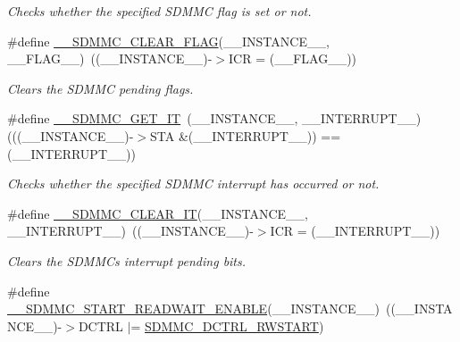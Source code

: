 \begin{DoxyCompactItemize}
\begin{DoxyCompactList}\small\item\em Checks whether the specified S\+D\+M\+MC flag is set or not. \end{DoxyCompactList}\item 
\#define \mbox{\hyperlink{group___s_d_m_m_c___l_l___interrupt___clock_ga1f35f651980bee563bd9c7d00052cdc8}{\+\_\+\+\_\+\+S\+D\+M\+M\+C\+\_\+\+C\+L\+E\+A\+R\+\_\+\+F\+L\+AG}}(\+\_\+\+\_\+\+I\+N\+S\+T\+A\+N\+C\+E\+\_\+\+\_\+,  \+\_\+\+\_\+\+F\+L\+A\+G\+\_\+\+\_\+)~((\+\_\+\+\_\+\+I\+N\+S\+T\+A\+N\+C\+E\+\_\+\+\_\+)-\/$>$I\+CR = (\+\_\+\+\_\+\+F\+L\+A\+G\+\_\+\+\_\+))
\begin{DoxyCompactList}\small\item\em Clears the S\+D\+M\+MC pending flags. \end{DoxyCompactList}\item 
\#define \mbox{\hyperlink{group___s_d_m_m_c___l_l___interrupt___clock_gaf2f7410908e86bd0a59f398f7a52ea1c}{\+\_\+\+\_\+\+S\+D\+M\+M\+C\+\_\+\+G\+E\+T\+\_\+\+IT}}~(\+\_\+\+\_\+\+I\+N\+S\+T\+A\+N\+C\+E\+\_\+\+\_\+, \+\_\+\+\_\+\+I\+N\+T\+E\+R\+R\+U\+P\+T\+\_\+\+\_\+)  (((\+\_\+\+\_\+\+I\+N\+S\+T\+A\+N\+C\+E\+\_\+\+\_\+)-\/$>$S\+TA \&(\+\_\+\+\_\+\+I\+N\+T\+E\+R\+R\+U\+P\+T\+\_\+\+\_\+)) == (\+\_\+\+\_\+\+I\+N\+T\+E\+R\+R\+U\+P\+T\+\_\+\+\_\+))
\begin{DoxyCompactList}\small\item\em Checks whether the specified S\+D\+M\+MC interrupt has occurred or not. \end{DoxyCompactList}\item 
\#define \mbox{\hyperlink{group___s_d_m_m_c___l_l___interrupt___clock_ga86db406c85993ed8b12903ca403538f0}{\+\_\+\+\_\+\+S\+D\+M\+M\+C\+\_\+\+C\+L\+E\+A\+R\+\_\+\+IT}}(\+\_\+\+\_\+\+I\+N\+S\+T\+A\+N\+C\+E\+\_\+\+\_\+,  \+\_\+\+\_\+\+I\+N\+T\+E\+R\+R\+U\+P\+T\+\_\+\+\_\+)~((\+\_\+\+\_\+\+I\+N\+S\+T\+A\+N\+C\+E\+\_\+\+\_\+)-\/$>$I\+CR = (\+\_\+\+\_\+\+I\+N\+T\+E\+R\+R\+U\+P\+T\+\_\+\+\_\+))
\begin{DoxyCompactList}\small\item\em Clears the S\+D\+M\+MC\textquotesingle{}s interrupt pending bits. \end{DoxyCompactList}\item 
\#define \mbox{\hyperlink{group___s_d_m_m_c___l_l___interrupt___clock_ga6fc4b7016cb0e6474a0aeb04d658d30a}{\+\_\+\+\_\+\+S\+D\+M\+M\+C\+\_\+\+S\+T\+A\+R\+T\+\_\+\+R\+E\+A\+D\+W\+A\+I\+T\+\_\+\+E\+N\+A\+B\+LE}}(\+\_\+\+\_\+\+I\+N\+S\+T\+A\+N\+C\+E\+\_\+\+\_\+)~((\+\_\+\+\_\+\+I\+N\+S\+T\+A\+N\+C\+E\+\_\+\+\_\+)-\/$>$D\+C\+T\+RL $\vert$= \mbox{\hyperlink{group___peripheral___registers___bits___definition_ga4302f186ec1e43bc38a4357db38fc0fa}{S\+D\+M\+M\+C\+\_\+\+D\+C\+T\+R\+L\+\_\+\+R\+W\+S\+T\+A\+RT}})

\end{DoxyCompactItemize}
